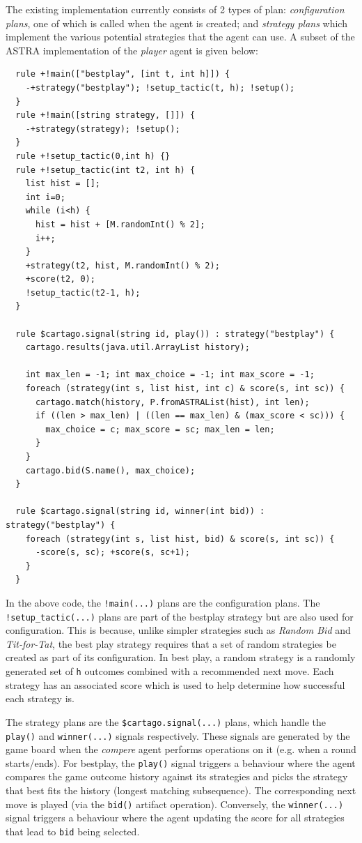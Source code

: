The existing implementation currently consists of 2 types of plan: \emph{configuration plans}, one of which is
called when the agent is created; and \emph{strategy plans} which implement the various potential strategies
that the agent can use. A subset of the ASTRA implementation of the \emph{player} agent is given below:

{\small
\begin{verbatim}
  rule +!main(["bestplay", [int t, int h]]) {
    -+strategy("bestplay"); !setup_tactic(t, h); !setup();
  }
  rule +!main([string strategy, []]) { 
    -+strategy(strategy); !setup();
  }
  rule +!setup_tactic(0,int h) {}
  rule +!setup_tactic(int t2, int h) {
    list hist = [];
    int i=0;
    while (i<h) {
      hist = hist + [M.randomInt() % 2];
      i++;
    }
    +strategy(t2, hist, M.randomInt() % 2);
    +score(t2, 0);
    !setup_tactic(t2-1, h);
  }
		
  rule $cartago.signal(string id, play()) : strategy("bestplay") {
    cartago.results(java.util.ArrayList history);
		
    int max_len = -1; int max_choice = -1; int max_score = -1;
    foreach (strategy(int s, list hist, int c) & score(s, int sc)) {
      cartago.match(history, P.fromASTRAList(hist), int len);
      if ((len > max_len) | ((len == max_len) & (max_score < sc))) {
        max_choice = c;	max_score = sc; max_len = len;
      }
    }
    cartago.bid(S.name(), max_choice);
  }
		
  rule $cartago.signal(string id, winner(int bid)) : strategy("bestplay") {
    foreach (strategy(int s, list hist, bid) & score(s, int sc)) {
      -score(s, sc); +score(s, sc+1);
    }
  }
\end{verbatim}}

In the above code, the \verb|!main(...)| plans are the configuration plans. The \verb|!setup_tactic(...)| 
plans are part of the bestplay strategy but are also used for configuration. This is because, unlike
simpler strategies such as \emph{Random Bid} and \emph{Tit-for-Tat}, the best play strategy requires 
that a set of random strategies be created as part of its configuration. In best play, a random strategy is
a randomly generated set of \verb|h| outcomes combined with a recommended next move. Each strategy has 
an associated score which is used to help determine how successful each strategy is.

The strategy plans are the \verb|$cartago.signal(...)| plans, which handle the \verb|play()| 
and \verb|winner(...)| signals respectively. These signals are generated by the game board when 
the  \emph{compere} agent performs operations on it (e.g. when a round starts/ends). For bestplay, the 
\verb|play()| signal triggers a behaviour where the agent compares the game outcome history against 
its strategies and picks the strategy that best fits the history (longest matching subsequence). The
corresponding next move is played (via the \verb|bid()| artifact operation). Conversely, the 
\verb|winner(...)| signal triggers a behaviour where the agent updating the score for all 
strategies that lead to \verb|bid| being selected.

